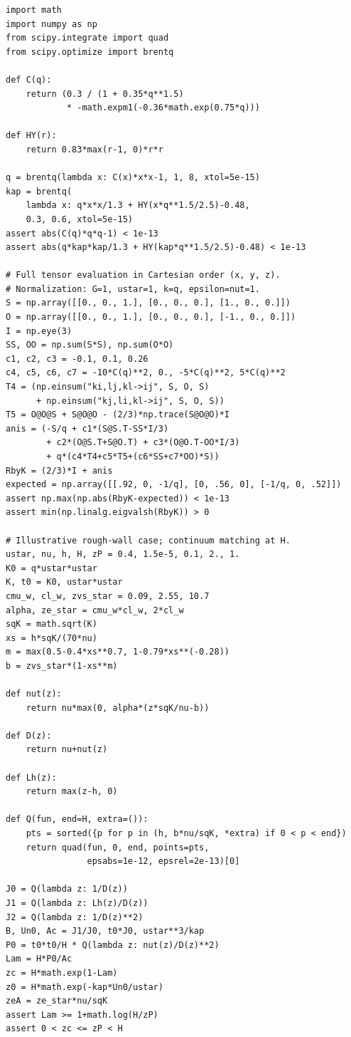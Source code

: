 \documentclass[11pt,a4paper]{article}
\numberwithin{equation}{section}
\begin{document}
\begin{lstlisting}[style=py]
import math
import numpy as np
from scipy.integrate import quad
from scipy.optimize import brentq

def C(q):
    return (0.3 / (1 + 0.35*q**1.5)
            * -math.expm1(-0.36*math.exp(0.75*q)))

def HY(r):
    return 0.83*max(r-1, 0)*r*r

q = brentq(lambda x: C(x)*x*x-1, 1, 8, xtol=5e-15)
kap = brentq(
    lambda x: q*x*x/1.3 + HY(x*q**1.5/2.5)-0.48,
    0.3, 0.6, xtol=5e-15)
assert abs(C(q)*q*q-1) < 1e-13
assert abs(q*kap*kap/1.3 + HY(kap*q**1.5/2.5)-0.48) < 1e-13

# Full tensor evaluation in Cartesian order (x, y, z).
# Normalization: G=1, ustar=1, k=q, epsilon=nut=1.
S = np.array([[0., 0., 1.], [0., 0., 0.], [1., 0., 0.]])
O = np.array([[0., 0., 1.], [0., 0., 0.], [-1., 0., 0.]])
I = np.eye(3)
SS, OO = np.sum(S*S), np.sum(O*O)
c1, c2, c3 = -0.1, 0.1, 0.26
c4, c5, c6, c7 = -10*C(q)**2, 0., -5*C(q)**2, 5*C(q)**2
T4 = (np.einsum("ki,lj,kl->ij", S, O, S)
      + np.einsum("kj,li,kl->ij", S, O, S))
T5 = O@O@S + S@O@O - (2/3)*np.trace(S@O@O)*I
anis = (-S/q + c1*(S@S.T-SS*I/3)
        + c2*(O@S.T+S@O.T) + c3*(O@O.T-OO*I/3)
        + q*(c4*T4+c5*T5+(c6*SS+c7*OO)*S))
RbyK = (2/3)*I + anis
expected = np.array([[.92, 0, -1/q], [0, .56, 0], [-1/q, 0, .52]])
assert np.max(np.abs(RbyK-expected)) < 1e-13
assert min(np.linalg.eigvalsh(RbyK)) > 0

# Illustrative rough-wall case; continuum matching at H.
ustar, nu, h, H, zP = 0.4, 1.5e-5, 0.1, 2., 1.
K0 = q*ustar*ustar
K, t0 = K0, ustar*ustar
cmu_w, cl_w, zvs_star = 0.09, 2.55, 10.7
alpha, ze_star = cmu_w*cl_w, 2*cl_w
sqK = math.sqrt(K)
xs = h*sqK/(70*nu)
m = max(0.5-0.4*xs**0.7, 1-0.79*xs**(-0.28))
b = zvs_star*(1-xs**m)

def nut(z):
    return nu*max(0, alpha*(z*sqK/nu-b))

def D(z):
    return nu+nut(z)

def Lh(z):
    return max(z-h, 0)

def Q(fun, end=H, extra=()):
    pts = sorted({p for p in (h, b*nu/sqK, *extra) if 0 < p < end})
    return quad(fun, 0, end, points=pts,
                epsabs=1e-12, epsrel=2e-13)[0]

J0 = Q(lambda z: 1/D(z))
J1 = Q(lambda z: Lh(z)/D(z))
J2 = Q(lambda z: 1/D(z)**2)
B, Un0, Ac = J1/J0, t0*J0, ustar**3/kap
P0 = t0*t0/H * Q(lambda z: nut(z)/D(z)**2)
Lam = H*P0/Ac
zc = H*math.exp(1-Lam)
z0 = H*math.exp(-kap*Un0/ustar)
zeA = ze_star*nu/sqK
assert Lam >= 1+math.log(H/zP)
assert 0 < zc <= zP < H


\end{lstlisting}
\end{document}
